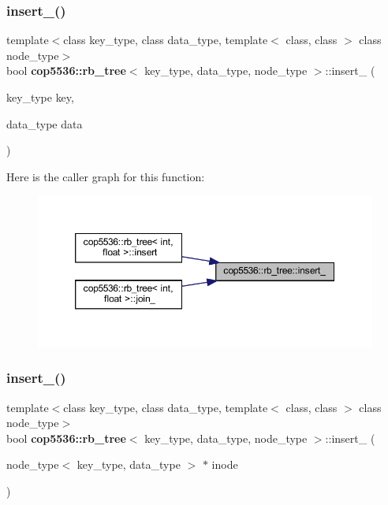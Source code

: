 \subsubsection{insert\_()\hspace{0.1cm}{\footnotesize\ttfamily [1/2]}}
{\footnotesize\ttfamily template$<$class key\+\_\+type, class data\+\_\+type, template$<$ class, class $>$ class node\+\_\+type$>$ \\
bool \textbf{ cop5536\+::rb\+\_\+tree}$<$ key\+\_\+type, data\+\_\+type, node\+\_\+type $>$\+::insert\+\_\+ (\begin{DoxyParamCaption}\item[{key\+\_\+type}]{key,  }\item[{data\+\_\+type}]{data }\end{DoxyParamCaption})\hspace{0.3cm}{\ttfamily [inline]}}

Here is the caller graph for this function\+:
\nopagebreak
\begin{figure}[H]
\begin{center}
\leavevmode
\includegraphics[width=350pt]{classcop5536_1_1rb__tree_a7a5907ab99800b3fdf73fdaa4d92e57a_icgraph}
\end{center}
\end{figure}
\mbox{\label{classcop5536_1_1rb__tree_a52941f6d690d7be0ee5a8d91247d7e05}} 
\subsubsection{insert\_()\hspace{0.1cm}{\footnotesize\ttfamily [2/2]}}
{\footnotesize\ttfamily template$<$class key\+\_\+type, class data\+\_\+type, template$<$ class, class $>$ class node\+\_\+type$>$ \\
bool \textbf{ cop5536\+::rb\+\_\+tree}$<$ key\+\_\+type, data\+\_\+type, node\+\_\+type $>$\+::insert\+\_\+ (\begin{DoxyParamCaption}\item[{node\+\_\+type$<$ key\+\_\+type, data\+\_\+type $>$ $\ast$}]{inode }\end{DoxyParamCaption})\hspace{0.3cm}{\ttfamily [inline]}}

